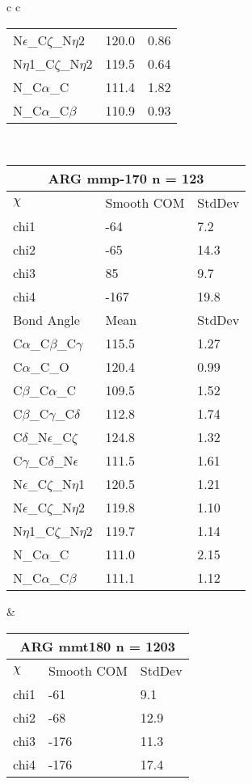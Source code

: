 \begin{longtable}{ c c }
\begin{tabular}{ l l l }
  N$\epsilon$\_C$\zeta$\_N$\eta$2 & 120.0 & 0.86\\
  N$\eta$1\_C$\zeta$\_N$\eta$2 & 119.5 & 0.64\\
  N\_C$\alpha$\_C & 111.4 & 1.82\\
  N\_C$\alpha$\_C$\beta$ & 110.9 & 0.93\\
  \bottomrule
  \end{tabular}
  \\
  \begin{tabular}{ l l l }
  \toprule
  \multicolumn{3}{c}{ARG \textbf{mmp-170} n = 123} \\ \toprule
  $\chi$       & Smooth COM & StdDev \\ \midrule
  chi1 & -64 & 7.2 \\ 
  chi2 & -65 & 14.3 \\ 
  chi3 & 85 & 9.7 \\ 
  chi4 & -167 & 19.8 \\ \midrule
  Bond Angle   & Mean     & StdDev \\ \midrule
  C$\alpha$\_C$\beta$\_C$\gamma$ & 115.5 & 1.27\\
  C$\alpha$\_C\_O & 120.4 & 0.99\\
  C$\beta$\_C$\alpha$\_C & 109.5 & 1.52\\
  C$\beta$\_C$\gamma$\_C$\delta$ & 112.8 & 1.74\\
  C$\delta$\_N$\epsilon$\_C$\zeta$ & 124.8 & 1.32\\
  C$\gamma$\_C$\delta$\_N$\epsilon$ & 111.5 & 1.61\\
  N$\epsilon$\_C$\zeta$\_N$\eta$1 & 120.5 & 1.21\\
  N$\epsilon$\_C$\zeta$\_N$\eta$2 & 119.8 & 1.10\\
  N$\eta$1\_C$\zeta$\_N$\eta$2 & 119.7 & 1.14\\
  N\_C$\alpha$\_C & 111.0 & 2.15\\
  N\_C$\alpha$\_C$\beta$ & 111.1 & 1.12\\
  \bottomrule
  \end{tabular}
  &
  \begin{tabular}{ l l l }
  \toprule
  \multicolumn{3}{c}{ARG \textbf{mmt180} n = 1203} \\ \toprule
  $\chi$       & Smooth COM & StdDev \\ \midrule
  chi1 & -61 & 9.1 \\ 
  chi2 & -68 & 12.9 \\ 
  chi3 & -176 & 11.3 \\ 
  chi4 & -176 & 17.4 \\ \midrule

\end{tabular}
\end{longtable}
